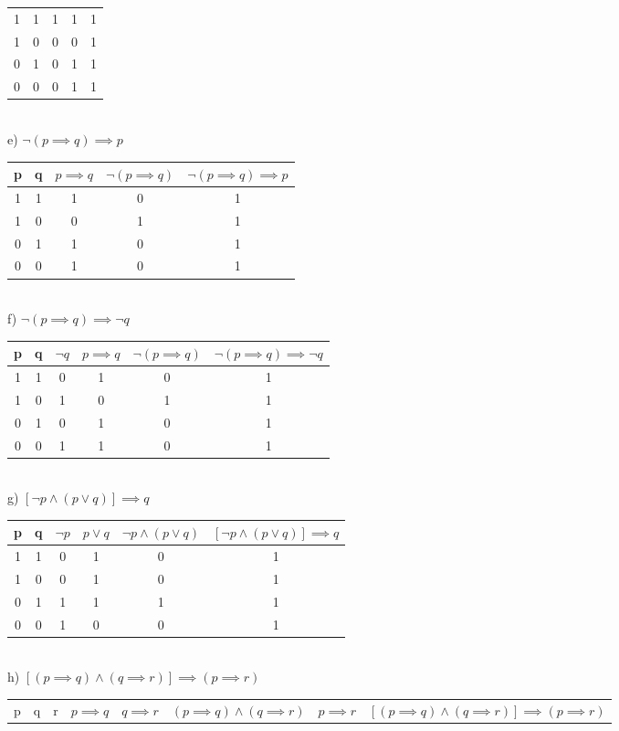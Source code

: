 \documentclass[a4paper]{article}
\begin{document}
\begin{table} [h]
\begin{tabular} {|c|c|c|c|c|}
			\hline
			1&1&1&1&1\\
			1&0&0&0&1\\
			0&1&0&1&1\\
			0&0&0&1&1\\
			\hline
		\end{tabular}
	\\
	\flushleft	e)   $\lnot (p \implies q) \implies p $\\
	\centering
		\begin{tabular} {|c|c|c|c|c|}
			\hline
			p&q&$p \implies q$&$\lnot (p \implies q)$&$\lnot (p \implies q) \implies p$\\
			\hline
			1&1&1&0&1\\
			1&0&0&1&1\\
			0&1&1&0&1\\
			0&0&1&0&1\\
			\hline
		\end{tabular}
	\\
	\flushleft	f)   $\lnot(p \implies q) \implies \lnot q $\\
	\centering
		\begin{tabular} {|c|c|c|c|c|c|}
			\hline
			p&q&$\lnot q$&$p \implies q$&$\lnot (p \implies q)$&$\lnot (p \implies q) \implies \lnot q$\\
			\hline
			1&1&0&1&0&1\\
			1&0&1&0&1&1\\
			0&1&0&1&0&1\\
			0&0&1&1&0&1\\
			\hline
		\end{tabular}
	\\
	\flushleft	g)   $[\lnot p \land (p \lor q )] \implies q $\\
	\centering
		\begin{tabular} {|c|c|c|c|c|c|}
			\hline
			p&q&$\lnot p$&$p \lor q$&$\lnot p \land (p \lor q)$&$[\lnot p \land (p \lor q )] \implies q $\\
			\hline
			1&1&0&1&0&1\\
			1&0&0&1&0&1\\
			0&1&1&1&1&1\\
			0&0&1&0&0&1\\
			\hline
		\end{tabular}
	\\	
	\flushleft	h)  $[(p \implies q) \land (q \implies r)] \implies (p \implies r)$\\
	\centering
		\begin{tabular} {|c|c|c|c|c|c|c|c|}
			\hline
			p&q&r&$p \implies q$&$q \implies r$&$(p \implies q) \land (q \implies r)$&$p \implies r$&$[(p \implies q) \land (q \implies r)] \implies (p \implies r)$\\

\end{tabular}
\end{table}
\end{document}
